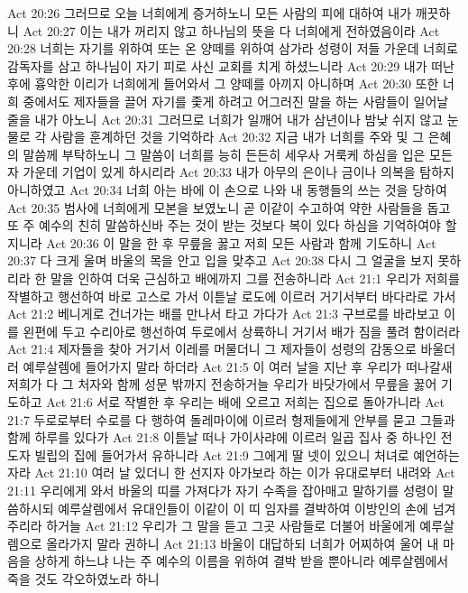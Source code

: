 Act 20:26  그러므로 오늘 너희에게 증거하노니 모든 사람의 피에 대하여 내가 깨끗하니
Act 20:27  이는 내가 꺼리지 않고 하나님의 뜻을 다 너희에게 전하였음이라
Act 20:28  너희는 자기를 위하여 또는 온 양떼를 위하여 삼가라 성령이 저들 가운데 너희로 감독자를 삼고 하나님이 자기 피로 사신 교회를 치게 하셨느니라
Act 20:29  내가 떠난 후에 흉악한 이리가 너희에게 들어와서 그 양떼를 아끼지 아니하며
Act 20:30  또한 너희 중에서도 제자들을 끌어 자기를 좇게 하려고 어그러진 말을 하는 사람들이 일어날 줄을 내가 아노니
Act 20:31  그러므로 너희가 일깨어 내가 삼년이나 밤낮 쉬지 않고 눈물로 각 사람을 훈계하던 것을 기억하라
Act 20:32  지금 내가 너희를 주와 및 그 은혜의 말씀께 부탁하노니 그 말씀이 너희를 능히 든든히 세우사 거룩케 하심을 입은 모든 자 가운데 기업이 있게 하시리라
Act 20:33  내가 아무의 은이나 금이나 의복을 탐하지 아니하였고
Act 20:34  너희 아는 바에 이 손으로 나와 내 동행들의 쓰는 것을 당하여
Act 20:35  범사에 너희에게 모본을 보였노니 곧 이같이 수고하여 약한 사람들을 돕고 또 주 예수의 친히 말씀하신바 주는 것이 받는 것보다 복이 있다 하심을 기억하여야 할지니라
Act 20:36  이 말을 한 후 무릎을 꿇고 저희 모든 사람과 함께 기도하니
Act 20:37  다 크게 울며 바울의 목을 안고 입을 맞추고
Act 20:38  다시 그 얼굴을 보지 못하리라 한 말을 인하여 더욱 근심하고 배에까지 그를 전송하니라
Act 21:1  우리가 저희를 작별하고 행선하여 바로 고스로 가서 이튿날 로도에 이르러 거기서부터 바다라로 가서
Act 21:2  베니게로 건너가는 배를 만나서 타고 가다가
Act 21:3  구브로를 바라보고 이를 왼편에 두고 수리아로 행선하여 두로에서 상륙하니 거기서 배가 짐을 풀려 함이러라
Act 21:4  제자들을 찾아 거기서 이레를 머물더니 그 제자들이 성령의 감동으로 바울더러 예루살렘에 들어가지 말라 하더라
Act 21:5  이 여러 날을 지난 후 우리가 떠나갈새 저희가 다 그 처자와 함께 성문 밖까지 전송하거늘 우리가 바닷가에서 무릎을 꿇어 기도하고
Act 21:6  서로 작별한 후 우리는 배에 오르고 저희는 집으로 돌아가니라
Act 21:7  두로로부터 수로를 다 행하여 돌레마이에 이르러 형제들에게 안부를 묻고 그들과 함께 하루를 있다가
Act 21:8  이튿날 떠나 가이사랴에 이르러 일곱 집사 중 하나인 전도자 빌립의 집에 들어가서 유하니라
Act 21:9  그에게 딸 넷이 있으니 처녀로 예언하는 자라
Act 21:10  여러 날 있더니 한 선지자 아가보라 하는 이가 유대로부터 내려와
Act 21:11  우리에게 와서 바울의 띠를 가져다가 자기 수족을 잡아매고 말하기를 성령이 말씀하시되 예루살렘에서 유대인들이 이같이 이 띠 임자를 결박하여 이방인의 손에 넘겨주리라 하거늘
Act 21:12  우리가 그 말을 듣고 그곳 사람들로 더불어 바울에게 예루살렘으로 올라가지 말라 권하니
Act 21:13  바울이 대답하되 너희가 어찌하여 울어 내 마음을 상하게 하느냐 나는 주 예수의 이름을 위하여 결박 받을 뿐아니라 예루살렘에서 죽을 것도 각오하였노라 하니
